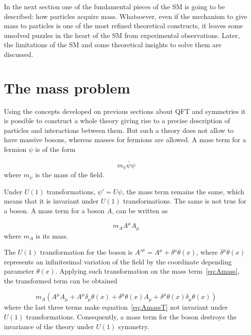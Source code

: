 In the next section one of the fundamental pieces of the SM is going to be described: how particles acquire mass. Whatsoever, even if the mechanism to give mass to particles is one of the most refined theoretical constructs, it leaves some unsolved puzzles in the heart of the SM from experimental observations. Later, the limitations of the SM and some theoretical insights to solve them are discussed.

\section{The mass problem}
\label{sec:mass}

Using the concepts developed on previous sections about QFT and symmetries it is possible to construct a whole theory giving rise to a precise description of particles and interactions between them. But such a theory does not allow to have massive bosons, whereas masses for fermions are allowed. A mass term for a fermion $\psi$ is of the form 

\begin{equation*}
  m_{\psi}\bar{\psi}\psi
\end{equation*} where $m_{\psi}$ is the mass of the field.

Under $U(1)$ transformations, $\psi'=U \psi$, the mass term remains the same, which means that it is invariant under $U(1)$ transformations. The same is not true for a boson. A mass term for a boson $A$, can be written as 

\begin{equation}
  \label{eq:Amass}
  m_{A}A^{\mu}A_{\mu}
\end{equation} where $m_{A}$ is its mass.

The $U(1)$ transformation for the boson is $A'^{\mu}=A^{\mu}+\delta^{\mu}\theta(x)$, where $\delta^{\mu}\theta(x)$ represents an infinitesimal variation of the field by the coordinate depending parameter $\theta(x)$. Applying such transformation on the mass term~\ref{eq:Amass}, the transformed term can be obtained

\begin{equation}
  \label{eq:AmassT}
  m_{A}\left(A^{\mu}A_{\mu}+A^{\mu}\delta_{\mu}\theta(x)+\delta^{\mu}\theta(x)A_{\mu}+\delta^{\mu}\theta(x)\delta_{\mu}\theta(x)\right)
\end{equation}where the last three terms make equation~\ref{eq:AmassT} not invariant under $U(1)$ transformations. Consequently, a mass term for the boson destroys the invariance of the theory under $U(1)$ symmetry.

